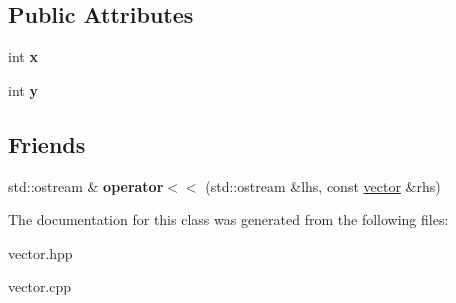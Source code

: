 \subsection*{Public Attributes}
\begin{DoxyCompactItemize}
\item 
\mbox{\label{classvector_a0403eb3aea23a3009e276fba1d317046}} 
int {\bfseries x}
\item 
\mbox{\label{classvector_aad6de640298eae97ca0a094db5aff477}} 
int {\bfseries y}
\end{DoxyCompactItemize}
\subsection*{Friends}
\begin{DoxyCompactItemize}
\item 
\mbox{\label{classvector_a7a6813f75dabd6f9575f9d6f91890255}} 
std\+::ostream \& {\bfseries operator$<$$<$} (std\+::ostream \&lhs, const \hyperlink{classvector}{vector} \&rhs)
\end{DoxyCompactItemize}


The documentation for this class was generated from the following files\+:\begin{DoxyCompactItemize}
\item 
vector.\+hpp\item 
vector.\+cpp\end{DoxyCompactItemize}
